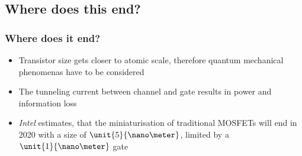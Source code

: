 \documentclass{beamer}
\begin{document}
\begin{frame}
\begin{columns}
\begin{column}{7.4cm}
\begin{center}
\begin{overprint}

\end{overprint}
\end{center}
\end{column}
\end{columns}
\end{frame}


\subsection{Where does this end?}
\begin{frame}\frametitle{Where does it end?} 
\begin{itemize}
 \item Transistor size gets closer to atomic scale, therefore quantum mechanical phenomenas have to be considered\pause
 \item The tunneling current between channel and gate results in power and information loss\pause
 \item \textit{Intel} estimates, that the miniaturisation of traditional MOSFETs will end in 2020 with a size of $\unit{5}{\nano\meter}$, limited by a \underline{$\unit{1}{\nano\meter}$} gate
\end{itemize}

\end{frame}
\end{document}
